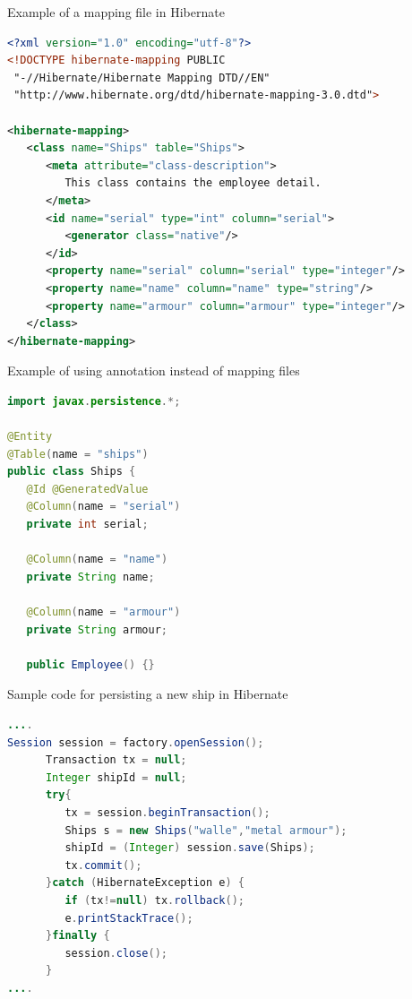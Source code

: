 \documentclass{beamer}
\begin{document}
\begin{frame}[fragile]
Example of a mapping file in Hibernate
\begin{lstlisting}[language=XML]
<?xml version="1.0" encoding="utf-8"?>
<!DOCTYPE hibernate-mapping PUBLIC 
 "-//Hibernate/Hibernate Mapping DTD//EN"
 "http://www.hibernate.org/dtd/hibernate-mapping-3.0.dtd"> 

<hibernate-mapping>
   <class name="Ships" table="Ships">
      <meta attribute="class-description">
         This class contains the employee detail. 
      </meta>
      <id name="serial" type="int" column="serial">
         <generator class="native"/>
      </id>
      <property name="serial" column="serial" type="integer"/>
      <property name="name" column="name" type="string"/>
      <property name="armour" column="armour" type="integer"/>
   </class>
</hibernate-mapping>
\end{lstlisting} 
\end{frame}

\begin{frame}[fragile]
Example of using annotation instead of mapping files 
\begin{lstlisting}[language=java]
import javax.persistence.*;

@Entity
@Table(name = "ships")
public class Ships {
   @Id @GeneratedValue
   @Column(name = "serial")
   private int serial;

   @Column(name = "name")
   private String name;

   @Column(name = "armour")
   private String armour; 

   public Employee() {}
   \end{lstlisting} 
\end{frame}

\begin{frame}[fragile]
Sample code for persisting a new ship in Hibernate 
\begin{lstlisting}[language=java]
....	
Session session = factory.openSession();
      Transaction tx = null;
      Integer shipId = null;
      try{
         tx = session.beginTransaction();
         Ships s = new Ships("walle","metal armour");
         shipId = (Integer) session.save(Ships); 
         tx.commit();
      }catch (HibernateException e) {
         if (tx!=null) tx.rollback();
         e.printStackTrace(); 
      }finally {
         session.close(); 
      }
....
   \end{lstlisting} 
\end{frame}
 
\end{document}
